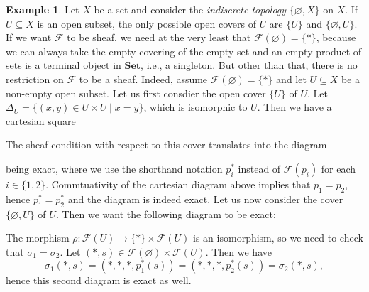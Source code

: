 \documentclass[12pt,a4paper]{amsart}
\theoremstyle{plain}
\theoremstyle{definition}
\newtheorem{exmp}[thm]{Example}
\theoremstyle{remark}
\begin{document}
\begin{exmp}
  Let $X$ be a set and consider the \textit{indiscrete topology} $\{ \varnothing, X \}$ on $X$.
  If $U \subseteq X$ is an open subset, the only possible open covers of $U$ are $\{ U \}$ and $\{ \varnothing, U \}$.
  If we want $\mathscr{F}$ to be sheaf, we need at the very least that $\mathscr{F}(\varnothing) = \{ * \}$, because we can always take the empty covering of the empty set and an empty product of sets is a terminal object in $\mathbf{Set}$, i.e., a singleton.
  But other than that, there is no restriction on $\mathscr{F}$ to be a sheaf.
  Indeed, assume $\mathscr{F}(\varnothing) = \{ * \}$ and let $U \subseteq X$ be a non-empty open subset.
  Let us first consdier the open cover $\{ U \}$ of $U$.
  Let $\Delta_{U} = \{ (x,y) \in U \times U \mid x = y \}$, which is isomorphic to $U$.
  Then we have a cartesian square
  \begin{center}
  \end{center}
  The sheaf condition with respect to this cover translates into the diagram
  \begin{center}
  \end{center}
  being exact, where we use the shorthand notation $p_{i}^{*}$ instead of $\mathscr{F}(p_{i})$ for each $i \in \{ 1, 2 \}$.
  Commtuativity of the cartesian diagram above implies that $p_{1} = p_{2}$, hence $p_{1}^{*} = p_{2}^{*}$ and the diagram is indeed exact.
  Let us now consider the cover $\{ \varnothing, U \}$ of $U$.
  Then we want the following diagram to be exact:
  \begin{center}
  \end{center}
  The morphism $\rho \colon \mathscr{F}(U) \to \{ * \} \times \mathscr{F}(U)$ is an isomorphism, so we need to check that $\sigma_{1} = \sigma_{2}$.
  Let $(*,s) \in \mathscr{F}(\varnothing) \times \mathscr{F}(U)$.
  Then we have
  \[ \sigma_{1}(*,s) = (*,*,*,p_{1}^{*}(s)) = (*,*,*,p_{2}^{*}(s)) = \sigma_{2}(*,s), \]
  hence this second diagram is exact as well.


\end{exmp}
\end{document}
